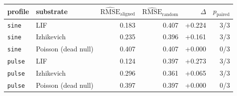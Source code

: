 \begin{tabular}{llrrrr}
\toprule
profile & substrate & $\widehat{\mathrm{RMSE}}_{\mathrm{aligned}}$ & $\widehat{\mathrm{RMSE}}_{\mathrm{random}}$ & $\Delta$ & $p_{\mathrm{paired}}$ \\
\midrule
\texttt{sine} & LIF & 0.183 & 0.407 & +0.224 & 3/3 \\
\texttt{sine} & Izhikevich & 0.235 & 0.396 & +0.161 & 3/3 \\
\texttt{sine} & Poisson (dead null) & 0.407 & 0.407 & +0.000 & 0/3 \\
\texttt{pulse} & LIF & 0.124 & 0.397 & +0.273 & 3/3 \\
\texttt{pulse} & Izhikevich & 0.296 & 0.361 & +0.065 & 3/3 \\
\texttt{pulse} & Poisson (dead null) & 0.397 & 0.397 & +0.000 & 0/3 \\
\bottomrule
\end{tabular}
